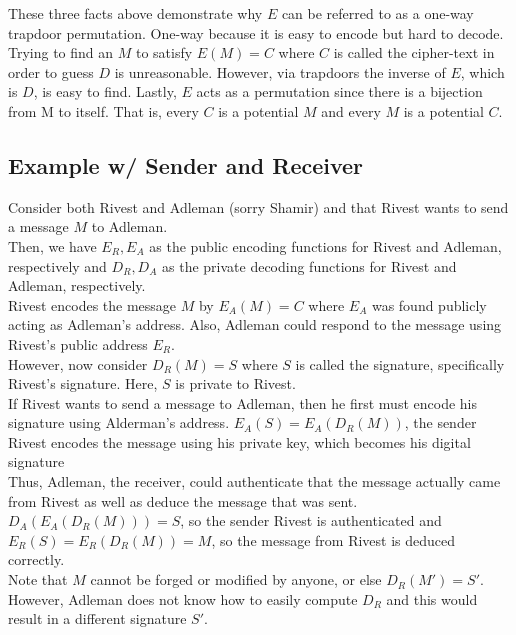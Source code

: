 \documentclass{article}
\begin{document}
\noindent These three facts above demonstrate why $E$ can be referred to as a one-way trapdoor permutation. One-way because it is easy to encode but hard to decode. Trying to find an $M$ to satisfy $E(M) = C$ where $C$ is called the cipher-text in order to guess $D$ is unreasonable. However, via trapdoors the inverse of $E$, which is $D$, is easy to find. Lastly, $E$ acts as a permutation since there is a bijection from M to itself. That is, every $C$ is a potential $M$ and every $M$ is a potential $C$. 

\subsection{Example w/ Sender and Receiver}
\indent \indent Consider both Rivest and Adleman (sorry Shamir) and that Rivest wants to send a message $M$ to Adleman. \\

Then, we have $E_R, E_A$ as the public encoding functions for Rivest and Adleman, respectively and $D_R, D_A$ as the private decoding functions for Rivest and Adleman, respectively. \\

Rivest encodes the message $M$ by $E_A(M) = C$ where $E_A$ was found publicly acting as Adleman's address. Also, Adleman could respond to the message using Rivest's public address $E_R$. \\

However, now consider $D_R(M) = S$ where $S$ is called the signature, specifically Rivest's signature. Here, $S$ is private to Rivest. \\

If Rivest wants to send a message to Adleman, then he first must encode his signature using Alderman's address. $E_A(S) = E_A(D_R(M))$, the sender Rivest encodes the message using his private key, which becomes his digital signature \\

Thus, Adleman, the receiver, could authenticate that the message actually came from Rivest as well as deduce the message that was sent. $D_A(E_A(D_R(M))) = S$, so the sender Rivest is authenticated and $E_R(S) = E_R(D_R(M)) = M$, so the message from Rivest is deduced correctly. \\

Note that $M$ cannot be forged or modified by anyone, or else $D_R(M') = S'$. However, Adleman does not know how to easily compute $D_R$ and this would result in a different signature $S'$. 
\end{document}
